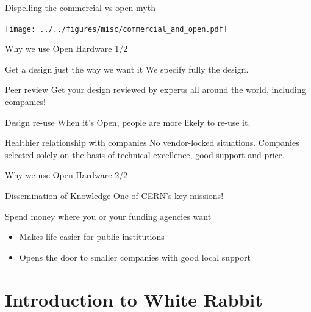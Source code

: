 \documentclass[compress, red]{beamer}
\begin{document}
\begin{frame}{Dispelling the commercial vs open myth}
 \begin{center}
   \texttt{[image: ../../figures/misc/commercial\_and\_open.pdf]}
 \end{center} 
\end{frame}

\begin{frame}{Why we use Open Hardware 1/2}
\pause
	\begin{block}{Get a design just the way we want it}
We specify fully the design.
	\end{block}	
\pause
	\begin{block}{Peer review}
	 Get your design reviewed by experts all around the world, including companies!
	\end{block}
\pause
\begin{block}{Design re-use}
  When it's Open, people are more likely to re-use it.
	\end{block}
\pause
	\begin{block}{Healthier relationship with companies}
          No vendor-locked situations. Companies selected solely on the basis of technical excellence, good support and price.
	\end{block}
\end{frame}

\begin{frame}{Why we use Open Hardware 2/2}
\pause
\begin{block}{Dissemination of Knowledge}
 One of CERN's key missions!
\end{block}
\pause
\begin{block}{Spend money where you or your funding agencies want}
 \begin{itemize}
   \item Makes life easier for public institutions
   \item Opens the door to smaller companies with good local support
  \end{itemize}
\end{block}	

\end{frame}



\section[WR Intro]{Introduction to White Rabbit}
\subsection{}
\end{document}
